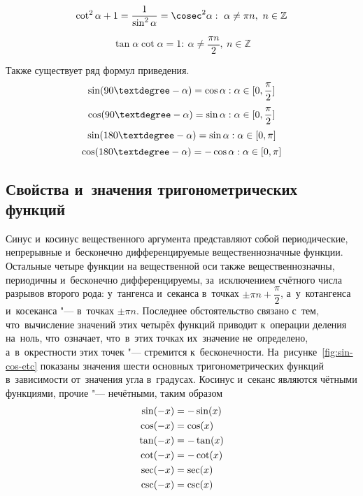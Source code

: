 \documentclass[]{scrartcl}
\begin{document}
\begin{equation}\label{eq:trigon-identity-3}
\cot^2 \alpha + 1 = \frac{1}{\sin^2 \alpha} = \cosec^2 \alpha:\ \alpha \neq \pi n,\ n \in \mathbb{Z}
\end{equation}

\begin{equation}\label{eq:trigon-identity-4}
\tan \alpha \cot \alpha = 1:\ \alpha \neq \frac{\pi n}{2},\ n \in \mathbb{Z}
\end{equation}

Также существует ряд формул приведения.
\begin{equation}\label{eq:trigon-identity-5}
\sin (90\textdegree-\alpha)=\cos \alpha: \alpha \in [0,\frac{\pi}{2}]
\end{equation}
\begin{equation}\label{eq:trigon-identity-6}
\cos (90\textdegree-\alpha)=\sin \alpha: \alpha \in [0,\frac{\pi}{2}]
\end{equation}
\begin{equation}\label{eq:trigon-identity-7}
\sin (180\textdegree-\alpha)=\sin \alpha: \alpha \in [0,\pi]
\end{equation}
\begin{equation}\label{eq:trigon-identity-8}
\cos (180\textdegree-\alpha)=-\cos \alpha: \alpha \in [0,\pi]
\end{equation}

\subsection{Свойства и~значения тригонометрических функций}
Синус и~косинус вещественного аргумента представляют собой периодические, непрерывные и~бесконечно дифференцируемые вещественнозначные функции. Остальные четыре функции на вещественной оси также вещественнозначны, периодичны и~бесконечно дифференцируемы, за~исключением счётного числа разрывов второго рода: у~тангенса и~секанса в~точках  $\textstyle \pm \pi n+ \dfrac{\pi}{2}$, а~у~котангенса и~косеканса "--- в~точках $\textstyle \pm \pi n$. Последнее обстоятельство связано с~тем, что~вычисление значений этих четырёх функций приводит к~операции деления на~ноль, что~означает, что~в~этих точках их~значение не~определено, а~в~окрестности этих точек "--- стремится к~бесконечности. На~рисунке~\ref{fig:sin-cos-etc} показаны значения шести основных тригонометрических функций в~зависимости от~значения угла в~градусах. Косинус и~секанс являются чётными функциями, прочие "--- нечётными, таким образом
\begin{equation}\label{eq:trigon-functions-parity}
\begin{aligned}
\sin(-x)&=-\sin(x)\\
\cos(-x)&=\cos(x)\\
\tan(-x)&=-\tan(x)\\
\cot(-x)&=-\cot(x)\\
\sec(-x)&=\sec(x)\\
\csc(-x)&=\-\csc(x)
\end{aligned}
\end{equation}
\end{document}
